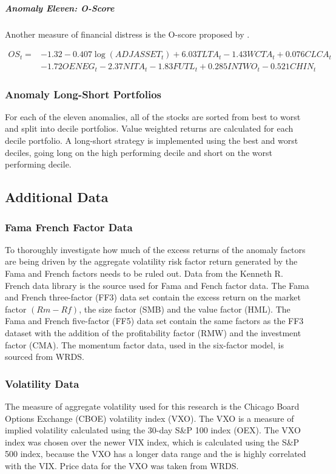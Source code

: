 \documentclass[12pt, a4paper, oneside]{article}
\begin{document}
\subparagraph*{Anomaly Eleven: O-Score}
Another measure of financial distress is the O-score proposed by .

\begin{align*}
    OS_t = &- 1.32 - 0.407 \log (ADJASSET_t )  + 6.03 TLTA_t- 1.43 WCTA_t+ 0.076 CLCA_t \\
    &- 1.72O ENEG_t- 2.37 NITA_t- 1.83 FUTL_t+ 0.285 INTWO_t- 0.521 CHIN_t
\end{align*}

\subsubsection{Anomaly Long-Short Portfolios}
For each of the eleven anomalies, all of the stocks are sorted from best to worst and split into decile portfolios. Value weighted returns are calculated for each decile portfolio. A long-short strategy is implemented using the best and worst deciles, going long on the high performing decile and short on the worst performing decile. 

\subsection{Additional Data}
\subsubsection{Fama French Factor Data}
To thoroughly investigate how much of the excess returns of the anomaly factors are being driven by the aggregate volatility risk factor return generated by the Fama and French factors needs to be ruled out. Data from the Kenneth R. French data library is the source used for Fama and Fench factor data. The Fama and French three-factor (FF3) data set contain the excess return on the market factor $(Rm - Rf)$, the size factor (SMB) and the value factor (HML). The Fama and French five-factor (FF5) data set contain the same factors as the FF3 dataset with the addition of the profitability factor (RMW) and the investment factor (CMA). The momentum factor data, used in the six-factor model, is sourced from WRDS.

\subsubsection{Volatility Data}
The measure of aggregate volatility used for this research is the Chicago Board Options Exchange (CBOE) volatility index (VXO). The VXO is a measure of implied volatility calculated using the 30-day S\&P 100 index (OEX). The VXO index was chosen over the newer VIX index, which is calculated using the S\&P 500 index, because the VXO has a longer data range and the is highly correlated with the VIX. Price data for the VXO was taken from WRDS.
\end{document}
